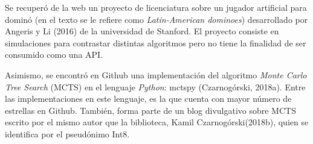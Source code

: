 Se recuperó de la web un proyecto de licenciatura sobre un jugador artificial
para dominó (en el texto se le refiere como \textit{Latin-American dominoes})
desarrollado por Angeris y Li (2016) de la universidad de Stanford. El proyecto
consiste en simulaciones para contrastar distintas algoritmos pero no tiene la
finalidad de ser consumido como una API.

Asimismo, se encontró en Github una implementación del algoritmo \textit{Monte
Carlo Tree Search} (MCTS) en el lenguaje \textit{Python}: mctspy (Czarnogórski,
2018a). Entre las implementaciones en este lenguaje, es la que cuenta con mayor
número de estrellas en Github. También, forma parte de un blog divulgativo sobre
MCTS escrito por el mismo autor que la biblioteca, Kamil Czarnogórski(2018b),
quien se identifica por el pseudónimo Int8.





